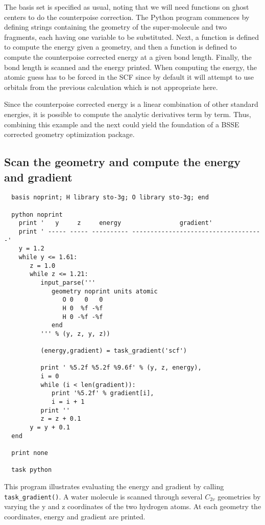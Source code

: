 The basis set is specified as usual, noting that we will need
functions on ghost centers to do the counterpoise correction.  The
Python program commences by defining strings containing the geometry
of the super-molecule and two fragments, each having one variable to be
substituted.  Next, a function is defined to compute the energy given
a geometry, and then a function is defined to compute the counterpoise
corrected energy at a given bond length.  Finally, the bond length is
scanned and the energy printed.  When computing the energy, the atomic
guess has to be forced in the SCF since by default it will attempt to
use orbitals from the previous calculation which is not appropriate
here.

Since the counterpoise corrected energy is a linear combination of
other standard energies, it is possible to compute the analytic
derivatives term by term.  Thus, combining this example and the next
could yield the foundation of a BSSE corrected geometry optimization
package.

\subsection{Scan the geometry and compute the energy and gradient}

\begin{verbatim}
  basis noprint; H library sto-3g; O library sto-3g; end

  python noprint
    print '   y     z     energy                gradient'
    print ' ----- ----- ---------- ------------------------------------'
    y = 1.2
    while y <= 1.61:
       z = 1.0
       while z <= 1.21:
          input_parse('''
             geometry noprint units atomic
                O 0   0   0
                H 0  %f -%f
                H 0 -%f -%f
             end
          ''' % (y, z, y, z))

          (energy,gradient) = task_gradient('scf')

          print ' %5.2f %5.2f %9.6f' % (y, z, energy),
          i = 0
          while (i < len(gradient)):
             print '%5.2f' % gradient[i],
             i = i + 1
          print ''
          z = z + 0.1
       y = y + 0.1
  end

  print none

  task python
\end{verbatim}

This program illustrates evaluating the energy and gradient
by calling \verb+task_gradient()+.  A water molecule is scanned
through several $C_{2v}$ geometries by varying the y and z coordinates
of the two hydrogen atoms.  At each geometry the coordinates, energy 
and gradient are printed.

